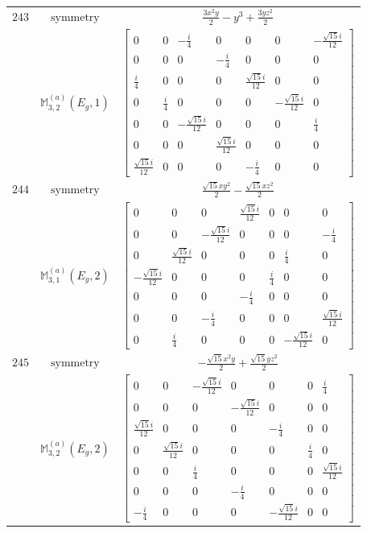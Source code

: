 \documentclass[fleqn,8pt,landscape]{jsarticle}
\begin{document}
\begin{longtable}{ccc}
$ 243 $ & $ \text{symmetry} $ & $ \frac{3 x^{2} y}{2} - y^{3} + \frac{3 y z^{2}}{2} $ \\
$  $ & $ \mathbb{M}_{3,2}^{(a)}(E_{g},1) $ & $ \begin{bmatrix} 0 & 0 & - \frac{i}{4} & 0 & 0 & 0 & - \frac{\sqrt{15} i}{12} \\ 0 & 0 & 0 & - \frac{i}{4} & 0 & 0 & 0 \\ \frac{i}{4} & 0 & 0 & 0 & \frac{\sqrt{15} i}{12} & 0 & 0 \\ 0 & \frac{i}{4} & 0 & 0 & 0 & - \frac{\sqrt{15} i}{12} & 0 \\ 0 & 0 & - \frac{\sqrt{15} i}{12} & 0 & 0 & 0 & \frac{i}{4} \\ 0 & 0 & 0 & \frac{\sqrt{15} i}{12} & 0 & 0 & 0 \\ \frac{\sqrt{15} i}{12} & 0 & 0 & 0 & - \frac{i}{4} & 0 & 0 \end{bmatrix} $ \\ \hline
$ 244 $ & $ \text{symmetry} $ & $ \frac{\sqrt{15} x y^{2}}{2} - \frac{\sqrt{15} x z^{2}}{2} $ \\
$  $ & $ \mathbb{M}_{3,1}^{(a)}(E_{g},2) $ & $ \begin{bmatrix} 0 & 0 & 0 & \frac{\sqrt{15} i}{12} & 0 & 0 & 0 \\ 0 & 0 & - \frac{\sqrt{15} i}{12} & 0 & 0 & 0 & - \frac{i}{4} \\ 0 & \frac{\sqrt{15} i}{12} & 0 & 0 & 0 & \frac{i}{4} & 0 \\ - \frac{\sqrt{15} i}{12} & 0 & 0 & 0 & \frac{i}{4} & 0 & 0 \\ 0 & 0 & 0 & - \frac{i}{4} & 0 & 0 & 0 \\ 0 & 0 & - \frac{i}{4} & 0 & 0 & 0 & \frac{\sqrt{15} i}{12} \\ 0 & \frac{i}{4} & 0 & 0 & 0 & - \frac{\sqrt{15} i}{12} & 0 \end{bmatrix} $ \\ \hline
$ 245 $ & $ \text{symmetry} $ & $ - \frac{\sqrt{15} x^{2} y}{2} + \frac{\sqrt{15} y z^{2}}{2} $ \\
$  $ & $ \mathbb{M}_{3,2}^{(a)}(E_{g},2) $ & $ \begin{bmatrix} 0 & 0 & - \frac{\sqrt{15} i}{12} & 0 & 0 & 0 & \frac{i}{4} \\ 0 & 0 & 0 & - \frac{\sqrt{15} i}{12} & 0 & 0 & 0 \\ \frac{\sqrt{15} i}{12} & 0 & 0 & 0 & - \frac{i}{4} & 0 & 0 \\ 0 & \frac{\sqrt{15} i}{12} & 0 & 0 & 0 & \frac{i}{4} & 0 \\ 0 & 0 & \frac{i}{4} & 0 & 0 & 0 & \frac{\sqrt{15} i}{12} \\ 0 & 0 & 0 & - \frac{i}{4} & 0 & 0 & 0 \\ - \frac{i}{4} & 0 & 0 & 0 & - \frac{\sqrt{15} i}{12} & 0 & 0 \end{bmatrix} $ \\ \hline

\end{longtable}
\end{document}
